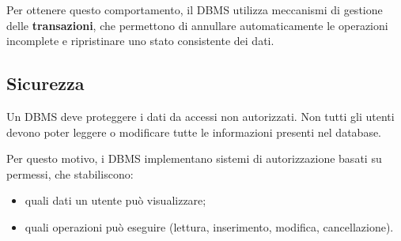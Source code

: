 \documentclass[a4paper,12pt]{article}
\begin{document}
Per ottenere questo comportamento, il DBMS utilizza meccanismi di gestione delle \textbf{transazioni}, che permettono di annullare automaticamente le operazioni incomplete e ripristinare uno stato consistente dei dati.

\subsection*{Sicurezza}
Un DBMS deve proteggere i dati da accessi non autorizzati.  
Non tutti gli utenti devono poter leggere o modificare tutte le informazioni presenti nel database.

Per questo motivo, i DBMS implementano sistemi di autorizzazione basati su permessi, che stabiliscono:
\begin{itemize}
    \item quali dati un utente può visualizzare;
    \item quali operazioni può eseguire (lettura, inserimento, modifica, cancellazione).
\end{itemize}


%
%
%
%
\end{document}
